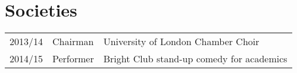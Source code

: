 \documentclass[a4paper]{deedy-resume} %
\begin{document}
\begin{minipage}[t]{0.66\textwidth}
    \section{Societies} 

    \begin{tabular}{rll}
        2013/14 & Chairman & University of London Chamber Choir\\
        2014/15 & Performer & Bright Club stand-up comedy for academics\\
    \end{tabular}

    \sectionspace %


\end{minipage} %
\hfill
%
\end{document}
